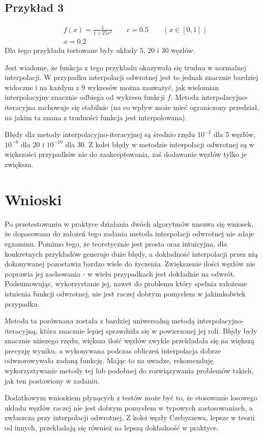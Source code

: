 \documentclass{article}
\begin{document}
\subsection{Przykład 3}

\begin{align*}
    &f(x)=\frac{1}{1+25x^2} \qquad c=0.5 \qquad (x\in[0, 1])\\
    &x=0.2
\end{align*}
Dla tego przykładu testowane były układy 5, 20 i 30 węzłów.

Jest wiadome, że funkcja z tego przykładu okazywała się trudna w normalnej interpolacji. W przypadku interpolacji odwrotnej jest to jednak znacznie bardziej widoczne i na każdym z 9 wykresów można zauważyć, jak wielomian interpolacyjny znacznie odbiega od wykresu funkcji $f$. Metoda interpolacyjno-iteracyjna zachowuje się stabilnie (na co wpływ może mieć ograniczony przedział, na jakim ta znana z trudności funkcja jest interpolowana).

Błędy dla metody interpolacyjno-iteracyjnej są średnio rzędu $10^{-2}$ dla 5 węzłów, $10^{-8}$ dla 20 i $10^{-10}$ dla 30. Z kolei błędy w metodzie interpolacji odwrotnej są w większości przypadków nie do zaakceptowania, zaś dodawanie węzłów tylko je zwiększa.

\section{Wnioski}

Po przetestowaniu w praktyce działania dwóch algorytmów nasuwa się wniosek, że dopasowana do założeń tego zadania metoda interpolacji odwrotnej nie zdaje egzaminu. Pomimo tego, że teoretycznie jest prosta oraz intuicyjna, dla konkretnych przykładów generuje duże błędy, a dokładność interpolacji przez nią dokonywanej pozostawia bardzo wiele do życzenia. Zwiększenie ilości węzłów nie poprawia jej zachowania - w wielu przypadkach jest dokładnie na odwrót. Podsumowując, wykorzystanie jej, nawet do problemu który spełnia założenie istnienia funkcji odwrotnej, nie jest raczej dobrym pomysłem w jakimkolwiek przypadku.

Metoda ta porównana została z bardziej uniwersalną metodą interpolacyjno-iteracyjną, która znacznie lepiej sprawdziła się w powierzonej jej roli. Błędy były znacznie niższego rzędu, większa ilość węzłów zwykle przekładała się na większą precyzję wyniku, a wykonywana podczas obliczeń interpolacja dobrze odwzorowywała zadaną funkcję. Mając to na uwadze, rekomenduję wykorzystywanie metody tej lub podobnej do rozwiązywania problemów takich, jak ten postawiony w zadaniu.

Dodatkowym wnioskiem płynących z testów może być to, że stosowanie losowego układu węzłów raczej nie jest dobrym pomysłem w typowych zastosowaniach, a zwłaszcza przy interpolacji odwrotnej. Z kolei węzły Czebyszewa, lepsze w teorii od innych, przekładają się również na lepszą dokładność w praktyce.
\end{document}
